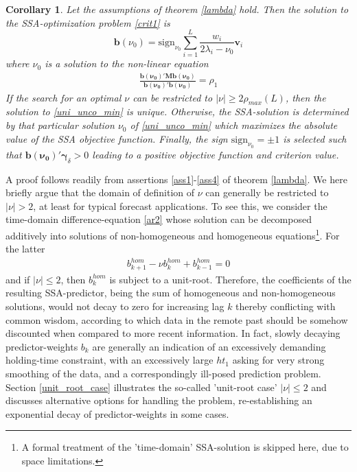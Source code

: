 \documentclass[a4paper]{article}
\newtheorem{Corollary}{Corollary}
\begin{document}
\begin{Corollary}\label{lambda_num_gen}
Let the assumptions of theorem \ref{lambda} hold. Then the solution to the SSA-optimization problem \ref{crit1} is 
\begin{equation}\label{prop_sol_un_unc_fast}
\mathbf{b}(\nu_0)=\textrm{sign}_{\nu_0}\sum_{i=1}^L \frac{w_i}{2\lambda_{i}-\nu_0}\mathbf{v}_{i}
\end{equation}
where $\nu_0$ is a solution to the non-linear equation
\begin{eqnarray}\label{uni_unco_min}
\frac{\mathbf{b(\nu_0)}'\mathbf{M}\mathbf{b(\nu_0)}}{\mathbf{b(\nu_0)}'\mathbf{b(\nu_0)}}=\rho_1
\end{eqnarray}
If the search for an optimal $\nu$ can be restricted to $|\nu|\geq 2\rho_{max}(L)$, then the solution to \ref{uni_unco_min} is unique. Otherwise, the SSA-solution is determined by that particular solution $\nu_0$ of \ref{uni_unco_min} which maximizes the absolute value of the SSA objective function. Finally, the sign $\textrm{sign}_{\nu_0}=\pm 1$ is selected such that $\mathbf{b(\nu_0)}'\boldsymbol{\gamma}_{\delta}> 0$ leading to a positive objective function and criterion value. 
\end{Corollary}


A proof follows readily from assertions \ref{ass1}-\ref{ass4} of theorem \ref{lambda}. We here briefly argue that the domain of definition of $\nu$ can generally be restricted to $|\nu|>2$, at least for typical forecast applications. To see this, we consider the time-domain difference-equation \ref{ar2} whose solution can be decomposed additively into solutions of non-homogeneous and homogeneous equations\footnote{A formal treatment of the 'time-domain' SSA-solution is skipped here, due to space limitations.}. For the latter
\begin{eqnarray}\label{hom_ar2}
b_{k+1}^{hom}-\nu b_k^{hom}+b_{k-1}^{hom}=0
\end{eqnarray}
and if $|\nu|\leq 2$, then $b_k^{hom}$ is subject to a unit-root. Therefore, the coefficients of the resulting SSA-predictor, being the sum of homogeneous and non-homogeneous solutions, would not decay to zero for increasing lag $k$ thereby  conflicting with common wisdom, according to which data in the remote past should be somehow discounted when compared to more recent information. In fact, slowly decaying predictor-weights $b_k$ are generally an indication of an excessively demanding holding-time constraint, with an excessively large $ht_1$ asking for very strong smoothing of the data, and a correspondingly ill-posed prediction problem. Section \ref{unit_root_case} illustrates the so-called 'unit-root case' $|\nu|\leq 2$ and discusses alternative options for handling the problem, re-establishing an exponential decay of predictor-weights in some cases.
\end{document}
